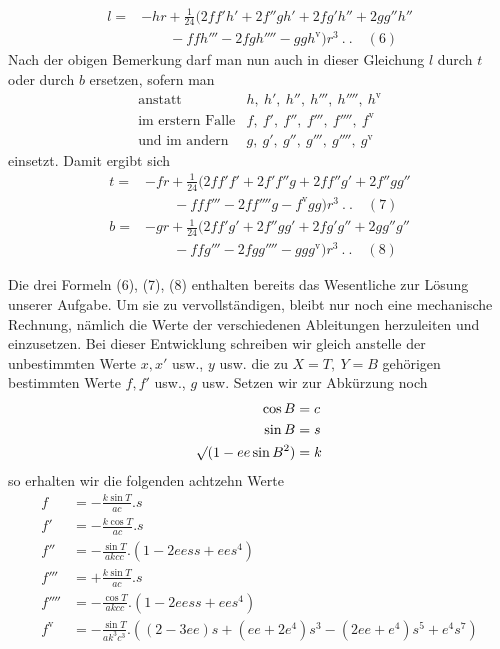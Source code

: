 %
\[
\begin{aligned}
l={}&-hr+\tfrac1{24}(2ff'h'+2f''gh'+2fg'h''+2gg''h''\\
&\qquad-ffh'''-2fgh''''-ggh^{\mathrm{v}})r^3\ .\ .\quad(6)
\end{aligned}
\]
Nach der obigen Bemerkung darf man nun auch in dieser Gleichung \(l\) durch \(t\) oder durch \(b\) ersetzen, sofern man
\[
\begin{array}{rl}
\text{anstatt}&h,\ h',\ h'',\ h''',\ h'''',\ h^{\mathrm{v}}\\
\text{im erstern Falle}&f,\ f',\ f'',\ f''',\ f'''',\ f^{\mathrm{v}}\\
\text{und im andern}&g,\ g',\ g'',\ g''',\ g'''',\ g^{\mathrm{v}}
\end{array}
\]
einsetzt. Damit ergibt sich
\[
\begin{aligned}
t={}&-fr+\tfrac1{24}(2ff'f'+2f'f''g+2ff''g'+2f''gg''\\
&\qquad-fff'''-2ff''''g-f^{\mathrm{v}}gg)r^3\ .\ .\quad(7)\\
b={}&-gr+\tfrac1{24}(2ff'g'+2f''gg'+2fg'g''+2gg''g''\\
&\qquad-ffg'''-2fgg''''-ggg^{\mathrm{v}})r^3\ .\ .\quad(8)
\end{aligned}
\]

Die drei Formeln (6), (7), (8) enthalten bereits das Wesentliche zur Lösung unserer Aufgabe. Um sie zu vervollständigen, bleibt nur noch eine mechanische Rechnung, nämlich die Werte der verschiedenen Ableitungen herzuleiten und einzusetzen. Bei dieser Entwicklung schreiben wir gleich anstelle der unbestimmten Werte \(x,x'\) usw., \(y\) usw. die zu \(X=T,\ Y=B\) gehörigen bestimmten Werte \(f,f'\) usw., \(g\) usw. Setzen wir zur Abkürzung noch
\[
\begin{aligned}
\cos B&=c\\
\sin B&=s\\
\mathord{{}^{}\!\surd}(1-ee\sin B^2)&=k
\end{aligned}
\]
so erhalten wir die folgenden achtzehn Werte
\[
\begin{aligned}
f&=-\frac{k\sin T}{ac}\mathord{.}s\\
f'&=-\frac{k\cos T}{ac}\mathord{.}s\\
f''&=-\frac{\sin T}{akcc}\mathord{.}(1-2eess+ees^4)\\
f'''&=+\frac{k\sin T}{ac}\mathord{.}s\\
f''''&=-\frac{\cos T}{akcc}\mathord{.}(1-2eess+ees^4)\\
f^{\mathrm{v}}&=-\frac{\sin T}{ak^3c^3}\mathord{.}((2-3ee)s+(ee+2e^4)s^3-(2ee+e^4)s^5+e^4s^7)
\end{aligned}
\]
